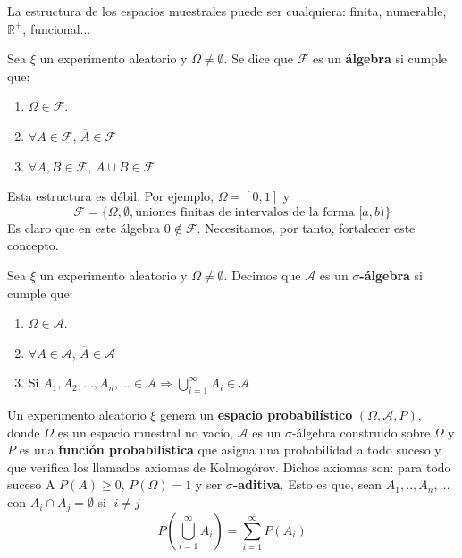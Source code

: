 \documentclass[PREyA.tex]{subfiles}
\begin{document}
\begin{nota} La estructura de los espacios muestrales puede ser cualquiera: finita, numerable, $\mathbb{R}^{+}$, funcional...
\end{nota}
\begin{defi}Sea $\xi$ un experimento aleatorio y $\Omega \neq \emptyset$. Se dice que $\mathscr{F}$ es un \textbf{\'algebra} si cumple que:
\begin{enumerate}
\item $\Omega \in \mathscr{F}$.
\item $\forall A \in \mathscr{F}$, $\overline{A} \in \mathscr{F}$
\item $\forall A,B \in \mathscr{F}$, $A\cup{B}\in \mathscr{F}$
\end{enumerate}
\end{defi}
\begin{nota} Esta estructura es débil. Por ejemplo, $\Omega = [0,1]$ y $$\mathscr{F} = \{\Omega,\emptyset,\text{uniones finitas de intervalos de la forma $[a,b)$}\}$$
 Es claro que en este álgebra $0\notin \mathscr{F}$. Necesitamos, por tanto, fortalecer este concepto.
\end{nota}
\begin{defi}
Sea $\xi$ un experimento aleatorio y $\Omega \neq \emptyset$. Decimos que $\mathscr{A}$ es un \textbf{$\sigma$-\'algebra} si cumple que:
\begin{enumerate}
\item $\Omega \in \mathscr{A}$.
\item $\forall A \in \mathscr{A}$, $\overline{A} \in \mathscr{A}$
\item Si $A_1,A_2,\dotsc,A_n,\dotsc\in \mathscr{A}\Rightarrow \bigcup_{i=1}^{\infty}A_i\in \mathscr{A}$
\end{enumerate}
\end{defi}
\begin{defi}
Un experimento aleatorio $\xi$ genera un \textbf{espacio probabil\'istico} $(\Omega,\mathscr{A}, P )$, donde $\Omega$ es un espacio muestral no vac\'io, $\mathscr{A}$ es un $\sigma$-\'algebra construido sobre $\Omega$ y $P$ es una \textbf{funci\'on probabil\'istica} que asigna una probabilidad a todo suceso y que verifica los llamados axiomas de Kolmog\'orov. Dichos axiomas son: para todo suceso A $ P (A)\geq 0$, $ P (\Omega)=1$ y ser \textbf{$\sigma$-aditiva}. Esto es que, sean $A_1,..,A_n,\dotsc$ con $A_i\cap A_j = \emptyset$ si $\; i\neq j$
\begin{equation*}
 P \left(\bigcup_{i=1}^{\infty}A_i\right) = \sum_{i=1}^{\infty}{ P (A_i)}
\end{equation*}
\end{defi}
\end{document}
